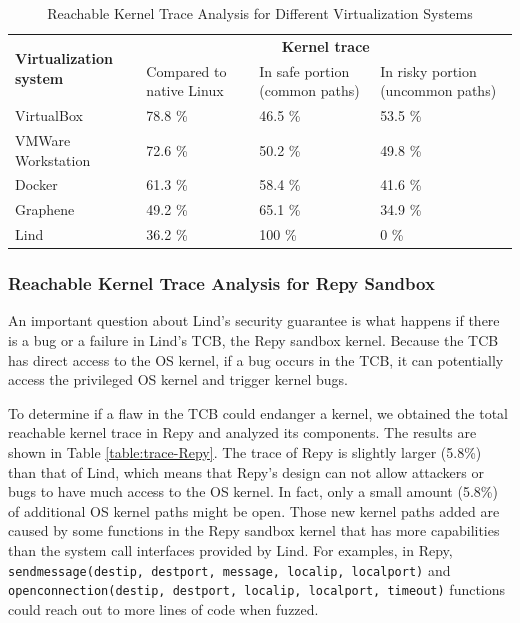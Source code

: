 \begin{table}
\centering
\scriptsize
\caption{Reachable Kernel Trace Analysis for Different Virtualization
Systems}
\begin{tabular}{|l|l|l|l|}
  \hline
  \multirow{3}{1.5cm}{\bf Virtualization system} & \multicolumn{3}{c|}{\bf Kernel trace} \\ \cline{2-4}
  & \multirow{2}{1.5cm}{Compared to native Linux} & \multirow{2}{1.8cm}{In safe portion 
  (common paths)} & \multirow{2}{2cm}{In risky portion (uncommon paths)} \\
  & & & \\  \hline
  VirtualBox & 78.8 \% & 46.5 \% & 53.5 \% \\
  \hline
  \multirow{2}{1.5cm}{VMWare Workstation} & \multirow{2}{*}{72.6 \%} & 
  \multirow{2}{*}{50.2 \%} & \multirow{2}{*}{49.8 \%} \\ 
  & & & \\   \hline
  Docker & 61.3 \% & 58.4 \% & 41.6 \% \\
  \hline
  Graphene & 49.2 \% & 65.1 \% & 34.9 \% \\
  \hline
  Lind & 36.2 \% & 100 \% & 0 \% \\
  \hline
\end{tabular}
\label{table:trace-systems}
\end{table}

\subsubsection{Reachable Kernel Trace Analysis for Repy Sandbox}
\label{Reachable-Kernel-Trace-Analysis-for-Repy-Sandbox}

An important question about Lind's security guarantee is what happens if
there is a bug or a failure in Lind's TCB, 
the Repy sandbox kernel. Because the TCB has direct access to the OS
kernel, if a bug occurs in the TCB, 
it can potentially access the privileged OS kernel and trigger kernel bugs. 

To determine if a flaw in the TCB could endanger a kernel, 
we obtained the total reachable kernel trace in Repy and analyzed its
components. 
The results are shown in Table \ref{table:trace-Repy}. The trace of Repy is
slightly larger (5.8\%) than that of Lind, 
which means that Repy's design can not allow attackers or bugs to 
have much access to the OS kernel. In fact, only a small amount (5.8\%) of
additional OS kernel paths might be open. 
Those new kernel paths added are caused by some functions in the Repy 
sandbox kernel that has more capabilities than the system call interfaces 
provided by Lind. 
For examples, in Repy, 
\texttt{sendmessage(destip, destport, message, localip, localport)} and 
\texttt{openconnection(destip, destport, localip, localport, timeout)}
functions could reach out to more lines of code when fuzzed.  

